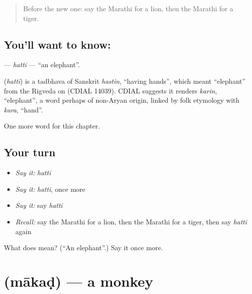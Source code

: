 \label{lesson:MR-C101-hatti}



\begin{quote}
Before the new one: say the Marathi for a lion, then the Marathi for a tiger.
\end{quote}

\subsection*{You'll want to know: }
\textbf{} — \emph{hattī} — \textquotedblleft{}an elephant\textquotedblright{}.

\begin{cousinweb}
\textbf{} (\emph{hattī}) is a tadbhava of Sanskrit \emph{hastin}, \textquotedblleft{}having hands\textquotedblright{}, which meant \textquotedblleft{}elephant\textquotedblright{} from the Rigveda on (CDIAL 14039). CDIAL suggests it renders \emph{karin}, \textquotedblleft{}elephant\textquotedblright{}, a word perhaps of non-Aryan origin, linked by folk etymology with \emph{kara}, \textquotedblleft{}hand\textquotedblright{}.
\end{cousinweb}

\begin{grammarlens}[title={What you've built}]
One more word for this chapter.
\end{grammarlens}

\subsection*{Your turn}
\begin{itemize}
\raggedright
  \item \emph{Say it:} \emph{hattī}
  \item \emph{Say it:} \emph{hattī}, once more
  \item \emph{Say it:} say \emph{hattī}
  \item \emph{Recall:} say the Marathi for a lion, then the Marathi for a tiger, then say \emph{hattī} again
\end{itemize}

\begin{tcolorbox}[breakable,colback=teal!4,colframe=teal!35!black,title={Before you move on}]
What does  mean? (\textquotedblleft{}An elephant\textquotedblright{}.) Say it once more.
\end{tcolorbox}
\section[\texorpdfstring{\mr{माकड} (mākaḍ)}{माकड (mākaḍ)}]{ (mākaḍ) — a monkey}

